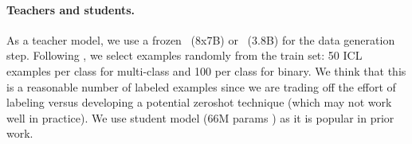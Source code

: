 



\paragraph{Teachers and students.}  As a teacher model, we use a frozen \Mixtral\ (8x7B) \citep{jiang2024mixtral} or \PhiMini\ (3.8B) \citep{abdin2024phi} for the data generation step. Following \citep{divekar2024synthesizrr}, we select examples randomly from the train set: 50 ICL examples per class for multi-class and 100 per class for binary. We think that this is a reasonable number of labeled examples since we are trading off the effort of labeling versus developing a potential zeroshot technique (which may not work well in practice). We use \DistilBERT{} student model (66M params \citet{Sanh2019DistilBERT}) as it is popular in prior work.

